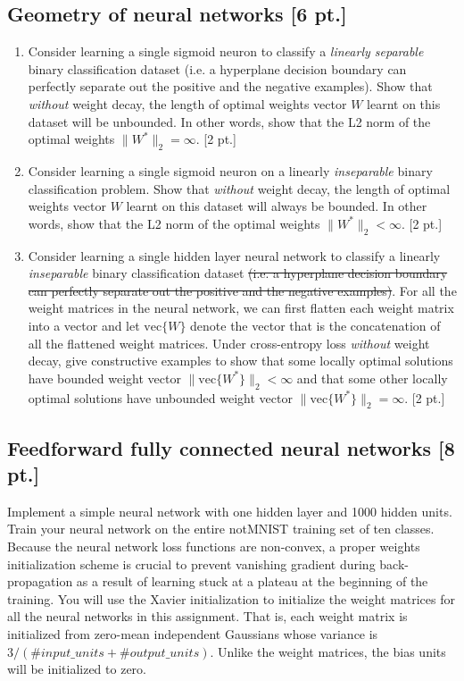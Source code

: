\documentclass[12pt,letterpaper]{article}
\begin{document}
\subsection{Geometry of neural networks [6 pt.]}
\begin{enumerate}
\item Consider learning a single sigmoid neuron to classify a \textit{linearly separable} binary classification dataset (i.e. a hyperplane decision boundary can perfectly separate out the positive and the negative examples). Show that \textit{without} weight decay, the length of optimal weights vector $W$ learnt on this dataset will be unbounded. In other words, show that the L2 norm of the optimal weights $\|W^* \|_2 = \infty$.  [2 pt.]
\item Consider learning a single sigmoid neuron on a linearly \textit{inseparable} binary classification problem. Show that \textit{without} weight decay, the length of optimal weights vector $W$ learnt on this dataset will always be bounded. In other words, show that the L2 norm of the optimal weights $\|W^* \|_2 < \infty$. [2 pt.]
\item Consider learning a single hidden layer neural network to classify a linearly \textit{inseparable} binary classification dataset \st{(i.e. a hyperplane decision boundary can perfectly separate out the positive and the negative examples)}. For all the weight matrices in the neural network, we can first flatten each weight matrix into a vector and let $\text{vec}\{W\}$ denote the vector that is the concatenation of all the flattened weight matrices. Under cross-entropy loss \textit{without} weight decay, give constructive examples to show that some locally optimal solutions have bounded weight vector $\|\text{vec}\{W^*\}\|_2<\infty$ and that some other locally optimal solutions have unbounded weight vector $\|\text{vec}\{W^*\}\|_2 = \infty$.  [2 pt.]
\end{enumerate}

\subsection{Feedforward fully connected neural networks [8 pt.]}
\label{subsec:fcnn}
Implement a simple neural network with one hidden layer and 1000 hidden units. Train your neural network on the entire notMNIST training set of ten classes. Because the neural network loss functions are non-convex, a proper weights initialization scheme is crucial to prevent vanishing gradient during back-propagation as a result of learning stuck at a plateau at the beginning of the training. You will use the Xavier initialization to initialize the weight matrices for all the neural networks in this assignment. That is, each weight matrix is initialized from zero-mean independent Gaussians whose variance is $3 / (\#input\_units + \#output\_units )$. Unlike the weight matrices, the bias units will be initialized to zero.
\end{document}

